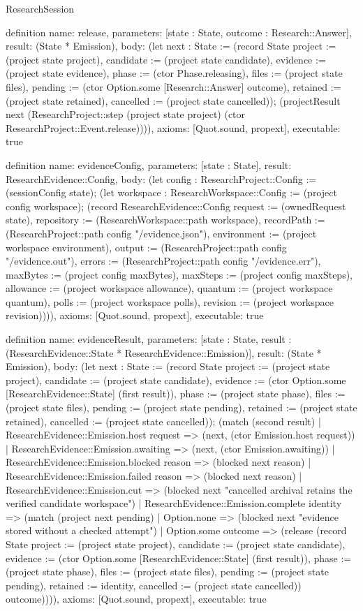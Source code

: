 \begin{lexlean}{ResearchSession}
\begin{semanticmodule}
definition{
 name: release,
 parameters: [state : State, outcome : Research::Answer],
 result: (State * Emission),
 body: (let next : State := (record State {project := (project state project), candidate := (project state candidate), evidence := (project state evidence), phase := (ctor Phase.releasing), files := (project state files), pending := (ctor Option.some [Research::Answer] outcome), retained := (project state retained), cancelled := (project state cancelled)}); (projectResult next (ResearchProject::step (project state project) (ctor ResearchProject::Event.release)))),
 axioms: [Quot.sound, propext],
 executable: true
}

definition{
 name: evidenceConfig,
 parameters: [state : State],
 result: ResearchEvidence::Config,
 body: (let config : ResearchProject::Config := (sessionConfig state); (let workspace : ResearchWorkspace::Config := (project config workspace); (record ResearchEvidence::Config {request := (ownedRequest state), repository := (ResearchWorkspace::path workspace), recordPath := (ResearchProject::path config "/evidence.json"), environment := (project workspace environment), output := (ResearchProject::path config "/evidence.out"), errors := (ResearchProject::path config "/evidence.err"), maxBytes := (project config maxBytes), maxSteps := (project config maxSteps), allowance := (project workspace allowance), quantum := (project workspace quantum), polls := (project workspace polls), revision := (project workspace revision)}))),
 axioms: [Quot.sound, propext],
 executable: true
}

definition{
 name: evidenceResult,
 parameters: [state : State, result : (ResearchEvidence::State * ResearchEvidence::Emission)],
 result: (State * Emission),
 body: (let next : State := (record State {project := (project state project), candidate := (project state candidate), evidence := (ctor Option.some [ResearchEvidence::State] (first result)), phase := (project state phase), files := (project state files), pending := (project state pending), retained := (project state retained), cancelled := (project state cancelled)}); (match (second result) | ResearchEvidence::Emission.host request => (next, (ctor Emission.host request)) | ResearchEvidence::Emission.awaiting => (next, (ctor Emission.awaiting)) | ResearchEvidence::Emission.blocked reason => (blocked next reason) | ResearchEvidence::Emission.failed reason => (blocked next reason) | ResearchEvidence::Emission.cut => (blocked next "cancelled archival retains the verified candidate workspace") | ResearchEvidence::Emission.complete identity => (match (project next pending) | Option.none => (blocked next "evidence stored without a checked attempt") | Option.some outcome => (release (record State {project := (project state project), candidate := (project state candidate), evidence := (ctor Option.some [ResearchEvidence::State] (first result)), phase := (project state phase), files := (project state files), pending := (project state pending), retained := identity, cancelled := (project state cancelled)}) outcome)))),
 axioms: [Quot.sound, propext],
 executable: true
}


\end{semanticmodule}
\end{lexlean}
